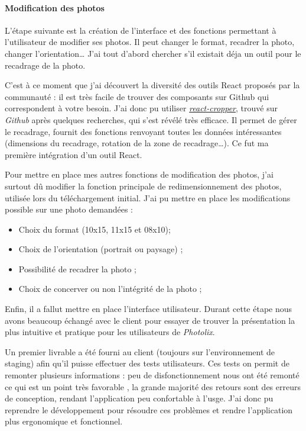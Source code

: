 \bigskip

\paragraph{Modification des photos}\label{modification-des-photos}

\bigskip

L'étape suivante est la création de l'interface et des fonctions
permettant à l'utilisateur de modifier ses photos. Il peut changer le
format, recadrer la photo, changer l'orientation\ldots{} J'ai tout
d'abord chercher s'il existait déja un outil pour le recadrage de la
photo.

\bigskip

C'est à ce moment que j'ai découvert la diversité des outils React
proposés par la communauté : il est très facile de trouver des
composants sur Github qui correspondent à votre besoin. J'ai donc pu
utiliser
\href{https://github.com/roadmanfong/react-cropper}{\emph{react-cropper}},
trouvé sur \emph{Github} après quelques recherches, qui s'est révélé
très efficace. Il permet de gérer le recadrage, fournit des fonctions
renvoyant toutes les données intéressantes (dimensions du recadrage,
rotation de la zone de recadrage\ldots{}). Ce fut ma première
intégration d'un outil React.

\bigskip

Pour mettre en place mes autres fonctions de modification des photos,
j'ai surtout dû modifier la fonction principale de redimensionnement des
photos, utilisée lors du téléchargement initial. J'ai pu mettre en place
les modifications possible sur une photo demandées :

\begin{itemize}
\tightlist
\item
  Choix du format (10x15, 11x15 et 08x10);
\item
  Choix de l'orientation (portrait ou paysage) ;
\item
  Possibilité de recadrer la photo ;
\item
  Choix de concerver ou non l'intégrité de la photo ;
\end{itemize}

\bigskip

Enfin, il a fallut mettre en place l'interface utilisateur. Durant cette
étape nous avons beaucoup échangé avec le client pour essayer de trouver
la présentation la plus intuitive et pratique pour les utilisateurs de
\emph{Photolix}.

Un premier livrable a été fourni au client (toujours sur l'environnement
de staging) afin qu'il puisse effectuer des tests utilisateurs. Ces
tests on permit de remonter plusieurs informations : peu de
disfonctionnement nous ont été remonté ce qui est un point très
favorable , la grande majorité des retours sont des erreurs de
conception, rendant l'application peu confortable à l'usge. J'ai donc pu
reprendre le développement pour résoudre ces problèmes et rendre
l'application plus ergonomique et fonctionnel.

